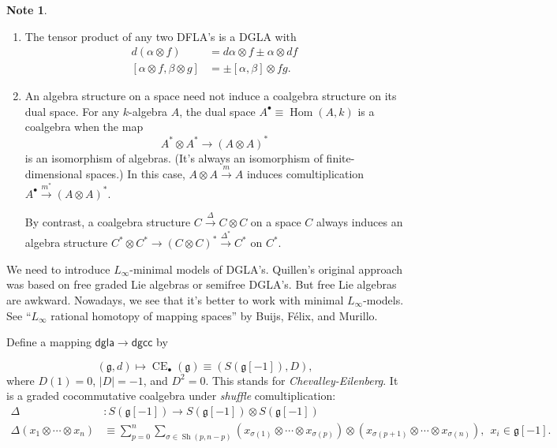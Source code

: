 \documentclass[10pt,letterpaper,cm]{nupset}
\theoremstyle{definition}
\newtheorem{note}[defn]{Note}
\theoremstyle{theorem}
\theoremstyle{remark}
\newcommand{\1}{\mathbb{1}}
\newcommand{\0}{\vec 0}
\DeclareMathOperator{\Hom}{Hom}
\DeclareMathOperator{\sh}{Sh}
\DeclareMathOperator{\ce}{CE}
\newcommand{\be}{\begin{enumerate}}
\newcommand{\ee}{\end{enumerate}}
\begin{document}
\begin{note} $ $
\be
\item The tensor product of any two DFLA's is a DGLA with
\begin{align*}
d(\alpha \otimes f) & = d{\alpha} \otimes f  \pm \alpha \otimes d{f}
\\ \left[\alpha \otimes f, \beta \otimes g\right] & = \pm\left[\alpha, \beta\right] \otimes fg
.\end{align*}
\item An algebra structure on a space need not induce a coalgebra structure on its dual space. For any $k$-algebra $A$,  the dual space $A^{\bullet} \equiv \Hom(A, k)$ is a  coalgebra when the map
\[
A^{\ast} \otimes A^{\ast} \to \left(A \otimes A\right)^{\ast}
\] is an isomorphism of algebras. (It's always an isomorphism of finite-dimensional spaces.) In this case, $A \otimes A \xrightarrow{m} A$ induces comultiplication $A^{\bullet} \xrightarrow{m^{\ast}} \left(A \otimes A \right)^{\ast}$.

By contrast, a coalgebra structure $C \xrightarrow{\Delta} C \otimes C$ on a space $C$ always induces an algebra structure $C^{\ast}\otimes C^{\ast} \to \left(C \otimes C\right)^{\ast} \xrightarrow{\Delta^{\ast}} C^{\ast}$ on $C^{\ast}$.
\ee
\end{note}

\smallskip

We need to introduce $L_{\infty}$-minimal models of DGLA's. Quillen's original approach was based on free graded Lie algebras or semifree DGLA's. But free Lie algebras are awkward. Nowadays, we see that it's better to work with minimal $L_{\infty}$-models. See ``$L_{\infty}$ rational homotopy of mapping spaces'' by Buijs, F\'elix, and Murillo. 


\medskip

Define a mapping $\mathsf{dgla} \to \mathsf{dgcc}$ by 

\[
\left(\mathfrak{g},d\right) \mapsto \ce_{\bullet}(\mathfrak{g}) \equiv \left(S(\mathfrak{g}\left[{-1}\right]), D\right),
\]
where $D(1) = 0$, $\left\lvert{D}\right\rvert = {-1}$, and $D^2 = 0$. 
This stands for \textit{Chevalley-Eilenberg}. It is a graded cocommutative coalgebra under \textit{shuffle}  comultiplication:
\begin{align*}
\Delta & : S(\mathfrak{g}\left[{-1}\right]) \to S(\mathfrak{g}\left[{-1}\right]) \otimes S(\mathfrak{g}\left[{-1}\right])
\\ \Delta(x_1 \otimes \cdots \otimes x_n) &  \equiv \sum_{p=0}^n\sum_{\sigma \in \sh(p, n-p)}\left(x_{\sigma(1)} \otimes \cdots \otimes x_{\sigma(p)}\right) \otimes \left(x_{\sigma(p+1)} \otimes \cdots \otimes x_{\sigma(n)}\right)
, \ \ x_i \in \mathfrak{g}\left[{-1}\right]
.
\end{align*}
\end{document}
